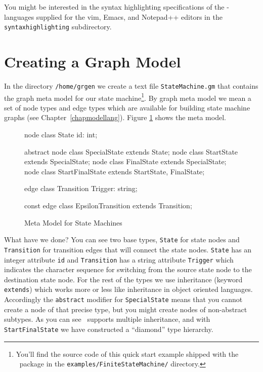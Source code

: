 \begin{note}
You might be interested in the syntax highlighting specifications of the \GrG-languages supplied for the vim, Emacs, and Notepad++ editors in the \texttt{syntaxhighlighting} subdirectory.
\end{note}


\section{Creating a Graph Model}
In the directory \texttt{/home/grgen} we create a text file \texttt{StateMachine.gm} that contains the graph meta model for our state machine\footnote{You'll find the source code of this quick start example shipped with the \GrG\ package in the \texttt{examples/FiniteStateMachine/} directory.}.
By graph meta model we mean a set of node types and edge types which are available for building state machine graphs (see Chapter~\ref{chapmodellang}).
Figure \ref{fig:quick:mm} shows the meta model.
\begin{figure}[htbp]
    \centering
    \begin{grgen}
node class State {
    id: int;
}

abstract node class SpecialState extends State;
node class StartState extends SpecialState;
node class FinalState extends SpecialState;
node class StartFinalState extends StartState, FinalState;

edge class Transition {
    Trigger: string;
}

const edge class EpsilonTransition extends Transition;
    \end{grgen}
    \caption{Meta Model for State Machines}
    \label{fig:quick:mm}
\end{figure}
What have we done?
You can see two base types, \texttt{State} for state nodes and \texttt{Transition} for transition edges that will connect the state nodes.
\texttt{State} has an integer attribute \texttt{id} and \texttt{Transition} has a string attribute \texttt{Trigger} which indicates the character sequence for switching from the source state node to the destination state node.
For the rest of the types we use inheritance (keyword \texttt{extends}) which works more or less like inheritance in object oriented languages.
Accordingly the \texttt{abstract} modifier for \texttt{SpecialState} means that you cannot create a node of that precise type, but you might create nodes of non-abstract subtypes.
As you can see \GrG\ supports multiple inheritance, and with \texttt{StartFinalState} we have constructed a ``diamond'' type hierarchy.


